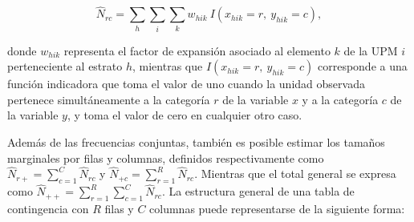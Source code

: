 \documentclass[
  spanish,
  12pt,
]{book}
\begin{document}
\[
\hat{N}_{rc} = \sum_{h} \sum_{i} \sum_{k} w_{hik} \ I(x_{hik}=r,\ y_{hik}=c),
\]

donde \(w_{hik}\) representa el factor de expansión asociado al elemento \(k\) de la UPM \(i\) perteneciente al estrato \(h\), mientras que \(I(x_{hik}=r,\ y_{hik}=c)\) corresponde a una función indicadora que toma el valor de uno cuando la unidad observada pertenece simultáneamente a la categoría \(r\) de la variable \(x\) y a la categoría \(c\) de la variable \(y\), y toma el valor de cero en cualquier otro caso.

Además de las frecuencias conjuntas, también es posible estimar los tamaños marginales por filas y columnas, definidos respectivamente como \(\hat{N}_{r+} = \sum_{c=1}^{C} \hat{N}_{rc}\) y \(\hat{N}_{+c} = \sum_{r=1}^{R} \hat{N}_{rc}\). Mientras que el total general se expresa como \(\hat{N}_{++} = \sum_{r=1}^{R}\sum_{c=1}^{C} \hat{N}_{rc}\). La estructura general de una tabla de contingencia con \(R\) filas y \(C\) columnas puede representarse de la siguiente forma:
\end{document}
